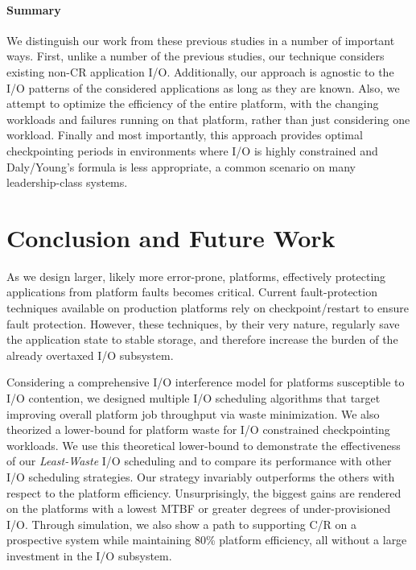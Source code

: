 \documentclass[two]{article}
\newcommand{\leastwaste}{\emph{Least-Waste}\xspace}
\def\cooperative{\leastwaste}
\begin{document}
\paragraph*{Summary}

We distinguish our work from these previous studies in a number of important ways.
First, unlike a number of the previous studies, our technique considers existing
non-CR application I/O. Additionally, our approach is agnostic to the I/O patterns of
the considered applications as long as they are known.  Also, we attempt to optimize
the efficiency of the entire platform, with the changing workloads and failures
running on that platform, rather than just considering one workload. Finally and most
importantly, this approach provides optimal checkpointing periods in environments
where I/O is highly constrained and Daly/Young's formula is less appropriate, a common
scenario on many leadership-class systems.


%
\section{Conclusion and Future Work} \label{sec:conclusion}

As we design larger, likely more error-prone, platforms, effectively protecting
applications from platform faults becomes critical. Current fault-protection
techniques available on production platforms rely on checkpoint/restart to
ensure fault protection. However, these techniques, by their very nature,
regularly save the application state to stable storage, and therefore increase
the burden of the already overtaxed I/O subsystem.

Considering a comprehensive I/O interference model for platforms susceptible to I/O
contention, we designed multiple I/O scheduling algorithms that target improving
overall platform job throughput via waste minimization. We also theorized a
lower-bound for platform waste for I/O constrained checkpointing workloads. We use
this theoretical lower-bound to demonstrate the effectiveness of our \cooperative
I/O scheduling and to compare its performance with other I/O
scheduling strategies.  Our strategy invariably outperforms the others
with respect to the platform efficiency. Unsurprisingly, the biggest gains are
rendered on the platforms with a lowest MTBF or greater degrees of under-provisioned
I/O. Through simulation, we also show a path to supporting C/R on a prospective
system while maintaining 80\% platform efficiency, all without a large
investment in the I/O subsystem.
\end{document}

